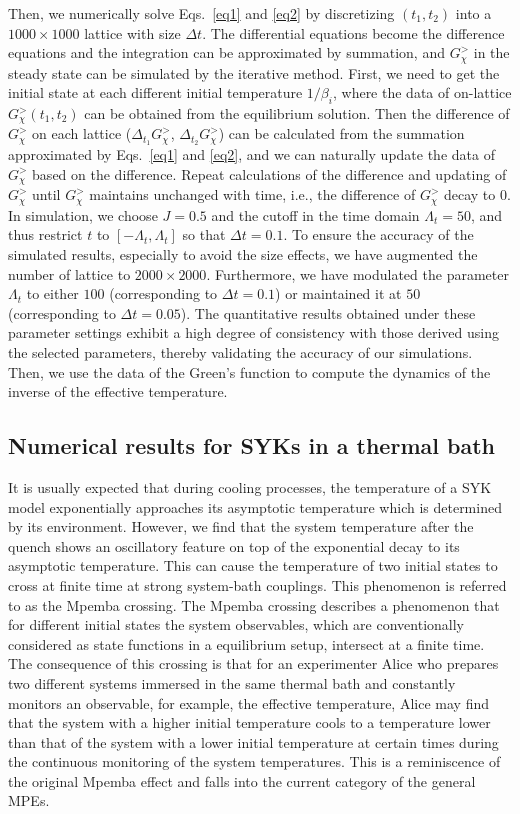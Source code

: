 Then, we numerically solve Eqs.~\eqref{eq1} and \eqref{eq2} by discretizing $(t_1,t_2)$ into a $1000\times 1000$ lattice with size $\Delta t$. The differential equations become the difference equations and the integration can be approximated by summation, and $G^>_\chi$ in the steady state can be simulated by the iterative method. First, we need to get the initial state at each different initial temperature $1/\beta_i$, where the data of on-lattice $G^>_\chi(t_1,t_2)$ can be obtained from the equilibrium solution. Then the difference of $G^>_\chi$ on each lattice ($\Delta_{t_1}G^>_\chi$, $\Delta_{t_2}G^>_\chi$) can be calculated from the summation approximated by Eqs.~\eqref{eq1} and \eqref{eq2}, and we can naturally update the data of $G^>_\chi$ based on the difference. Repeat calculations of the difference and updating of $G^>_\chi$ until $G^>_\chi$ maintains unchanged with time, i.e., the difference of $G^>_\chi$ decay to $0$. In simulation, we choose $J=0.5$ and the cutoff in the time domain $\Lambda_t=50$, and thus restrict $t$ to $[-\Lambda_t,\Lambda_t]$ so that $\Delta t=0.1$. To ensure the accuracy of the simulated results, especially to avoid the size effects, we have augmented the number of lattice to $2000\times2000$. Furthermore, we have modulated the parameter $\Lambda_t$ to either $100$ (corresponding to $\Delta t = 0.1$) or maintained it at $50$ (corresponding to $\Delta t = 0.05$). The quantitative results obtained under these parameter settings exhibit a high degree of consistency with those derived using the selected parameters, thereby validating the accuracy of our simulations. Then, we use the data of the Green's function to compute the dynamics of the inverse of the effective temperature.



\subsection{Numerical results for SYKs in a thermal bath}
It is usually expected that during cooling processes, the temperature of a SYK model exponentially approaches its asymptotic temperature which is determined by its environment. However, we find that the system temperature after the quench shows an oscillatory feature on top of the exponential decay to its asymptotic temperature. This can cause the temperature of two initial states to cross at finite time at strong system-bath couplings. This phenomenon is referred to as the Mpemba crossing. The Mpemba crossing describes a phenomenon that for different initial states the system observables, which are conventionally considered as state functions in a equilibrium setup, intersect at a finite time. The consequence of this crossing is that for an experimenter Alice who prepares two different systems immersed in the same thermal bath and constantly monitors an observable, for example, the effective temperature, Alice may find that the system with a higher initial temperature cools to a temperature lower than that of the system with a lower initial temperature at certain times during the continuous monitoring of the system temperatures. This is a reminiscence of the original Mpemba effect and falls into the current category of the general MPEs.

